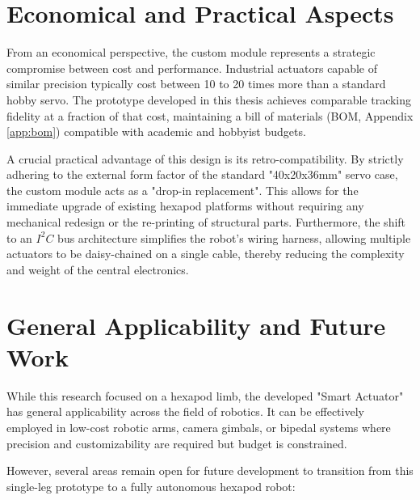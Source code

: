 \section{Economical and Practical Aspects}

From an economical perspective, the custom module represents a strategic compromise between cost and performance.
Industrial actuators capable of similar precision typically cost between 10 to 20 times more than a standard hobby
servo. The prototype developed in this thesis achieves comparable tracking fidelity at a fraction of that cost,
maintaining a bill of materials (BOM, Appendix \ref{app:bom}) compatible with academic and hobbyist budgets.

A crucial practical advantage of this design is its retro-compatibility. By strictly adhering to the external
form factor of the standard "40x20x36mm" servo case, the custom module acts as a "drop-in replacement". This allows for
the immediate upgrade of existing hexapod platforms without requiring any mechanical redesign or the re-printing of
structural parts. Furthermore, the shift to an $I^2C$ bus architecture simplifies the robot's wiring harness, allowing
multiple actuators to be daisy-chained on a single cable, thereby reducing the complexity and weight of the central
electronics.


\section{General Applicability and Future Work}

While this research focused on a hexapod limb, the developed "Smart Actuator" has general applicability across the field
of robotics. It can be effectively employed in low-cost robotic arms, camera gimbals, or bipedal systems where precision
and customizability are required but budget is constrained.

However, several areas remain open for future development to transition from this single-leg prototype to a fully
autonomous hexapod robot:

